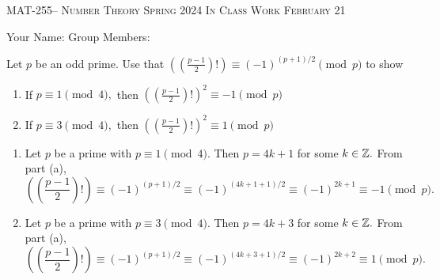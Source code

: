 \documentclass[handout]{ximera}
\date{February 21, 2024}
\begin{document}
\handoutAbstract
\maketitle
  \begin{center}%
    {\large \scshape MAT-255-- Number Theory \hfill Spring 2024 \hfill In Class Work February 21}%
    
    {\large
        Your Name: \hrulefill \quad Group Members:\hrulefill \quad \hrulefill
	\par}%
  \end{center}%


  \begin{br}
    Let $p$ be an odd prime. Use that $\left(\left(\frac{p-1}{2}\right)!\right)\equiv (-1)^{(p+1)/2} \pmod{p}$ to show
    \begin{enumerate}
        
        \item If $p\equiv 1\pmod{4},$ then $\left(\left(\frac{p-1}{2}\right)!\right)^2\equiv -1 \pmod{p}$
        
        \item If $p\equiv 3\pmod{4},$ then $\left(\left(\frac{p-1}{2}\right)!\right)^2\equiv 1 \pmod{p}$
    \end{enumerate}

    \begin{solution}

        \begin{enumerate}
            
            \item Let $p$ be a prime with $p\equiv 1 \pmod 4.$ Then $p=4k+1$ for some $k\in\mathbb Z.$ From part (a), 
            \[\left(\left(\frac{p-1}{2}\right)!\right)\equiv (-1)^{(p+1)/2} \equiv (-1)^{(4k+1+1)/2}\equiv (-1)^{2k+1}\equiv -1 \pmod{p}.\]

            \item Let $p$ be a prime with $p\equiv 3 \pmod 4.$ Then $p=4k+3$ for some $k\in\mathbb Z.$ From part (a), 
            \[\left(\left(\frac{p-1}{2}\right)!\right)\equiv (-1)^{(p+1)/2} \equiv (-1)^{(4k+3+1)/2}\equiv (-1)^{2k+2}\equiv 1 \pmod{p}.\]
            
        \end{enumerate}
        
    \end{solution}
\end{br}


  
\end{document}
